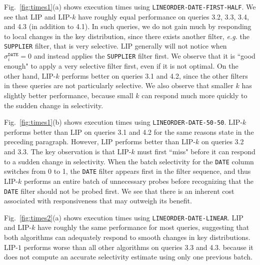 Fig.~\ref{fig:times1}(a) shows execution times using \texttt{LINEORDER-DATE-FIRST-HALF}. 
We see that LIP and LIP-$k$ have roughly equal performance on queries 3.2, 3.3, 3.4, and 4.3 (in addition to 4.1).
In such queries, we do not gain much by responding to local changes in the key distribution,
since there exists another filter, {\it e.g.} the \texttt{SUPPLIER} filter, that is very selective. 
LIP generally will not notice when $\sigma_i^{\texttt{DATE}} = 0$ 
and instead applies the \texttt{SUPPLIER} filter first.
We observe that it is ``good enough" to apply a very selective filter first, even if it is not optimal.
On the other hand, LIP-$k$ performs better on queries 3.1 and 4.2, 
since the other filters in these queries are not particularly selective. 
We also observe that smaller $k$ has slightly better performance, 
because small $k$ can respond much more quickly to the sudden change in selectivity.

Fig.~\ref{fig:times1}(b) shows execution times using \texttt{LINEORDER-DATE-50-50}. 
LIP-$k$ performs better than LIP on queries 3.1 and 4.2 for the same reasons state in the preceding paragraph.
However, LIP performs better than LIP-$k$ on queries 3.2 and 3.3.
The key observation is that LIP-$k$ must first ``miss" before it can respond to a sudden change in selectivity.
When the batch selectivity for the \texttt{DATE} column switches from 0 to 1, 
the \texttt{DATE} filter appears first in the filter sequence, 
and thus LIP-$k$ performs an entire batch of unnecessary probes
before recognizing that the \texttt{DATE} filter should not be probed first.
We see that there is an inherent cost associated with responsiveness that may outweigh its benefit. 

Fig.~\ref{fig:times2}(a) shows execution times using \texttt{LINEORDER-DATE-LINEAR}. 
LIP and LIP-$k$ have roughly the same performance for most queries, 
suggesting that both algorithms can adequately respond to smooth changes in key distributions.
LIP-$1$ performs worse than all other algorithms on queries 3.3 and 4.3.
because it does not compute an accurate selectivity estimate using only one previous batch.

